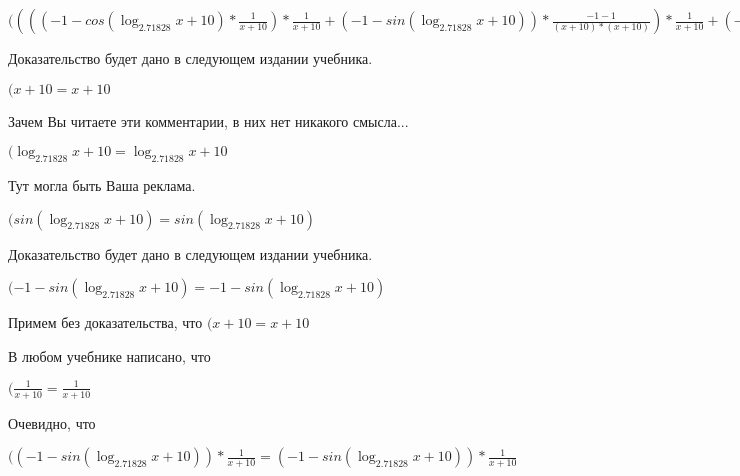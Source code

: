 \documentclass[12pt,a4paper,fleqn]{article}
\theoremstyle{definition}
\begin{document}
$(((( -1  - cos(\log_{ 2.71828 }{ x  +  10 }) * \frac{ 1 }{ x  +  10 }
) * \frac{ 1 }{ x  +  10 }
 + ( -1  - sin(\log_{ 2.71828 }{ x  +  10 })) * \frac{ -1  -  1 }{( x  +  10 ) * ( x  +  10 )}
) * \frac{ 1 }{ x  +  10 }
 + ( -1  - sin(\log_{ 2.71828 }{ x  +  10 })) * \frac{ 1 }{ x  +  10 }
 * \frac{ -1  -  1 }{( x  +  10 ) * ( x  +  10 )}
 + ( -1  - sin(\log_{ 2.71828 }{ x  +  10 })) * \frac{ 1 }{ x  +  10 }
 * \frac{ -2 }{( x  +  10 ) * ( x  +  10 )}
 + cos(\log_{ 2.71828 }{ x  +  10 }) * \frac{ -1  -  -2  * ( x  +  10  +  x  +  10 )}{( x  +  10 ) * ( x  +  10 ) * ( x  +  10 ) * ( x  +  10 )}
) * cos(\log_{ 2.71828 }{ x  +  10 }) * \frac{ 1 }{ x  +  10 }
 * { 3 }^{sin(\log_{ 2.71828 }{ x  +  10 })} = ((( -1  - cos(\log_{ 2.71828 }{ x  +  10 }) * \frac{ 1 }{ x  +  10 }
) * \frac{ 1 }{ x  +  10 }
 + ( -1  - sin(\log_{ 2.71828 }{ x  +  10 })) * \frac{ -1  -  1 }{( x  +  10 ) * ( x  +  10 )}
) * \frac{ 1 }{ x  +  10 }
 + ( -1  - sin(\log_{ 2.71828 }{ x  +  10 })) * \frac{ 1 }{ x  +  10 }
 * \frac{ -1  -  1 }{( x  +  10 ) * ( x  +  10 )}
 + ( -1  - sin(\log_{ 2.71828 }{ x  +  10 })) * \frac{ 1 }{ x  +  10 }
 * \frac{ -2 }{( x  +  10 ) * ( x  +  10 )}
 + cos(\log_{ 2.71828 }{ x  +  10 }) * \frac{ -1  -  -2  * ( x  +  10  +  x  +  10 )}{( x  +  10 ) * ( x  +  10 ) * ( x  +  10 ) * ( x  +  10 )}
) * cos(\log_{ 2.71828 }{ x  +  10 }) * \frac{ 1 }{ x  +  10 }
 * { 3 }^{sin(\log_{ 2.71828 }{ x  +  10 })}$

Доказательство будет дано в следующем издании учебника.

$( x  +  10  =  x  +  10 $

Зачем Вы читаете эти комментарии, в них нет никакого смысла...

$(\log_{ 2.71828 }{ x  +  10 } = \log_{ 2.71828 }{ x  +  10 }$

Тут могла быть Ваша реклама.

$(sin(\log_{ 2.71828 }{ x  +  10 }) = sin(\log_{ 2.71828 }{ x  +  10 })$

Доказательство будет дано в следующем издании учебника.

$( -1  - sin(\log_{ 2.71828 }{ x  +  10 }) =  -1  - sin(\log_{ 2.71828 }{ x  +  10 })$

Примем без доказательства, что
$( x  +  10  =  x  +  10 $

В любом учебнике написано, что

$(\frac{ 1 }{ x  +  10 }
 = \frac{ 1 }{ x  +  10 }
$

Очевидно, что

$(( -1  - sin(\log_{ 2.71828 }{ x  +  10 })) * \frac{ 1 }{ x  +  10 }
 = ( -1  - sin(\log_{ 2.71828 }{ x  +  10 })) * \frac{ 1 }{ x  +  10 }
$
\end{document}
